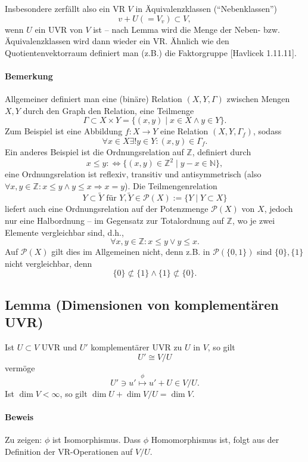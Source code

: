 	Insbesondere zerfällt also ein VR $ V $ in Äquivalenzklassen ("`Nebenklassen"')
		\[ v+U (= V_v)\subset V, \]
	wenn $ U $ ein UVR von $ V $ ist -- nach Lemma wird die Menge der Neben- bzw. Äquivalenzklassen wird dann wieder ein VR. Ähnlich wie den Quotientenvektorraum definiert man (z.B.) die Faktorgruppe [Havlicek 1.11.11].
	
\paragraph{Bemerkung}
	Allgemeiner definiert man eine (binäre) Relation $ (X,Y,\Gamma) $ zwischen Mengen $ X, Y $ durch den Graph den Relation, eine Teilmenge
		\[ \Gamma \subset X\times Y = \{(x,y)\mid x\in X \land y\in Y\}. \]
	Zum Beispiel ist eine Abbildung $ f:X\to Y $ eine Relation $ (X,Y,\Gamma_f) $, sodass
		\[ \forall x\in X\exists ! y\in Y:(x,y)\in \Gamma_f. \]
	Ein anderes Beispiel ist die Ordnungsrelation auf $ \mathbb{Z} $, definiert durch
		\[ x\leq y :\Leftrightarrow \{(x,y)\in \mathbb{Z}^2\mid y-x\in \mathbb{N}\}, \]
	eine Ordnungsrelation ist reflexiv, transitiv und antisymmetrisch (also $ \forall x,y\in \mathbb{Z}: x\leq y\land y\leq x\Rightarrow x=y $).
	Die Teilmengenrelation
		\[ Y\subset\tilde{Y} \text{ für } Y,\tilde{Y}\in \mathcal{P}(X):= \{Y\mid Y\subset X\} \]
	liefert auch eine Ordnungsrelation auf der Potenzmenge $ \mathcal{P}(X) $ von $ X $, jedoch nur eine Halbordnung -- im Gegensatz zur Totalordnung auf $ \mathbb{Z} $, wo je zwei Elemente vergleichbar sind, d.h.,
		\[ \forall x,y\in \mathbb{Z}: x\leq y\lor y\leq x. \]
	Auf $ \mathcal{P}(X) $ gilt dies im Allgemeinen nicht, denn z.B. in $ \mathcal{P}(\{0,1\}) $ sind $ \{0\},\{1\} $ nicht vergleichbar, denn
		\[ \{0\}\not\subset\{1\}\land \{1\}\not\subset \{0\}. \]

\subsection{Lemma (Dimensionen von komplementären UVR)}
	\begin{Lemma}
		Ist $ U\subset V $ UVR und $ U' $ komplementärer UVR zu $ U $ in $ V $, so gilt
		\[ U'\cong V/U \]
	vermöge
		\[ U'\ni u' \overset{\phi}{\mapsto} u'+U\in V/U. \]
	Ist $ \dim V<\infty $, so gilt $ \dim U+\dim V/U = \dim V $.
	\end{Lemma}
	
\paragraph{Beweis}
	Zu zeigen: $ \phi $ ist Isomorphismus. Dass $ \phi $ Homomorphismus ist, folgt aus der Definition der VR-Operationen auf $ V/U $.

